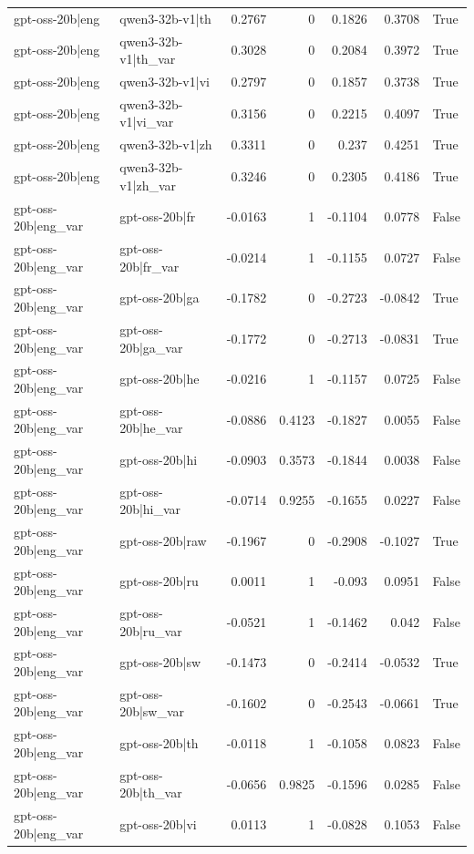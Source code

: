 \begin{table}
\begin{tabular}{l l r r r r l}
gpt-oss-20b|eng & qwen3-32b-v1|th & 0.2767 & 0 & 0.1826 & 0.3708 & True \\
gpt-oss-20b|eng & qwen3-32b-v1|th_var & 0.3028 & 0 & 0.2084 & 0.3972 & True \\
gpt-oss-20b|eng & qwen3-32b-v1|vi & 0.2797 & 0 & 0.1857 & 0.3738 & True \\
gpt-oss-20b|eng & qwen3-32b-v1|vi_var & 0.3156 & 0 & 0.2215 & 0.4097 & True \\
gpt-oss-20b|eng & qwen3-32b-v1|zh & 0.3311 & 0 & 0.237 & 0.4251 & True \\
gpt-oss-20b|eng & qwen3-32b-v1|zh_var & 0.3246 & 0 & 0.2305 & 0.4186 & True \\
gpt-oss-20b|eng_var & gpt-oss-20b|fr & -0.0163 & 1 & -0.1104 & 0.0778 & False \\
gpt-oss-20b|eng_var & gpt-oss-20b|fr_var & -0.0214 & 1 & -0.1155 & 0.0727 & False \\
gpt-oss-20b|eng_var & gpt-oss-20b|ga & -0.1782 & 0 & -0.2723 & -0.0842 & True \\
gpt-oss-20b|eng_var & gpt-oss-20b|ga_var & -0.1772 & 0 & -0.2713 & -0.0831 & True \\
gpt-oss-20b|eng_var & gpt-oss-20b|he & -0.0216 & 1 & -0.1157 & 0.0725 & False \\
gpt-oss-20b|eng_var & gpt-oss-20b|he_var & -0.0886 & 0.4123 & -0.1827 & 0.0055 & False \\
gpt-oss-20b|eng_var & gpt-oss-20b|hi & -0.0903 & 0.3573 & -0.1844 & 0.0038 & False \\
gpt-oss-20b|eng_var & gpt-oss-20b|hi_var & -0.0714 & 0.9255 & -0.1655 & 0.0227 & False \\
gpt-oss-20b|eng_var & gpt-oss-20b|raw & -0.1967 & 0 & -0.2908 & -0.1027 & True \\
gpt-oss-20b|eng_var & gpt-oss-20b|ru & 0.0011 & 1 & -0.093 & 0.0951 & False \\
gpt-oss-20b|eng_var & gpt-oss-20b|ru_var & -0.0521 & 1 & -0.1462 & 0.042 & False \\
gpt-oss-20b|eng_var & gpt-oss-20b|sw & -0.1473 & 0 & -0.2414 & -0.0532 & True \\
gpt-oss-20b|eng_var & gpt-oss-20b|sw_var & -0.1602 & 0 & -0.2543 & -0.0661 & True \\
gpt-oss-20b|eng_var & gpt-oss-20b|th & -0.0118 & 1 & -0.1058 & 0.0823 & False \\
gpt-oss-20b|eng_var & gpt-oss-20b|th_var & -0.0656 & 0.9825 & -0.1596 & 0.0285 & False \\
gpt-oss-20b|eng_var & gpt-oss-20b|vi & 0.0113 & 1 & -0.0828 & 0.1053 & False \\

\end{tabular}
\end{table}
